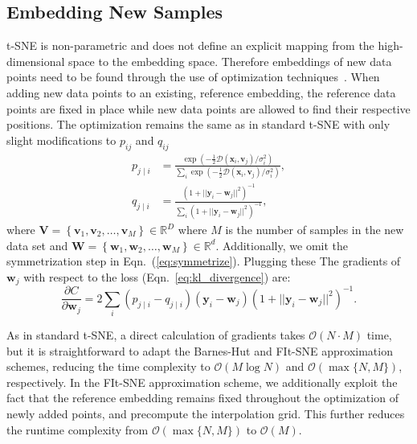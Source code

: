\documentclass[twocolumn]{bmcart}
\newcommand{\opentsne}{\textsf{openTSNE}}
\begin{document}

\subsection*{Embedding New Samples}

t-SNE is non-parametric and does not define an explicit mapping from the
high-dimensional space to the embedding space. Therefore embeddings of new data
points need to be found through the use of optimization
techniques~\cite{policar2019embedding}. When adding new data points to an
existing, reference embedding, the reference data points are fixed in place while
new data points are allowed to find their respective positions. The
optimization remains the same as in standard t-SNE with only slight
modifications to $p_{ij}$ and $q_{ij}$
\begin{align}
p_{j \mid i} &= \frac{\exp \left ( -\frac{1}{2} \mathcal{D}(\mathbf{x}_i, \mathbf{v}_j) /  \sigma_i^2 \right )}{\sum_{i} \exp \left ( -\frac{1}{2} \mathcal{D}(\mathbf{x}_i, \mathbf{v}_j) / \sigma_i^2 \right )}, \\
q_{j \mid i} &= \frac{\left ( 1 + || \mathbf{y}_i - \mathbf{w}_j ||^2 \right )^{-1}}{\sum_{i}\left ( 1 + || \mathbf{y}_i - \mathbf{w}_j ||^2 \right )^{-1}},
\end{align}
\noindent where $\mathbf{V} = \left \{ \mathbf{v}_1, \mathbf{v}_2, \dots,
\mathbf{v}_M \right \} \in \mathbb{R}^D$ where $M$ is the number of samples in
the new data set and $\mathbf{W} = \left \{ \mathbf{w}_1, \mathbf{w}_2, \dots,
\mathbf{w}_M \right \} \in \mathbb{R}^d$. Additionally, we omit the
symmetrization step in Eqn.~(\ref{eq:symmetrize}).
Plugging these
The gradients of
$\mathbf{w}_j$ with respect to the loss (Eqn.~\ref{eq:kl_divergence}) are:
\begin{equation}
\frac{\partial C}{\partial \mathbf{w}_j} = 2 \sum_i \left ( p_{j \mid i} - q_{j \mid i} \right ) \left ( \mathbf{y}_i - \mathbf{w}_j \right ) \left ( 1 + || \mathbf{y}_i - \mathbf{w}_j || ^2 \right )^{-1}.
\label{eq:gradient}
\end{equation}

As in standard t-SNE, a direct calculation of gradients takes $\mathcal{O}(N
\cdot M)$ time, but it is straightforward to adapt the Barnes-Hut and FIt-SNE
approximation schemes, reducing the time complexity to $\mathcal{O}(M \log N)$
and $\mathcal{O}(\max \{ N, M \})$, respectively. In the FIt-SNE approximation
scheme, we additionally exploit the fact that the reference embedding remains
fixed throughout the optimization of newly added points, and precompute the
interpolation grid. This further reduces the runtime complexity from
$\mathcal{O}(\max \{ N, M \})$ to $\mathcal{O}(M)$.
\end{document}
